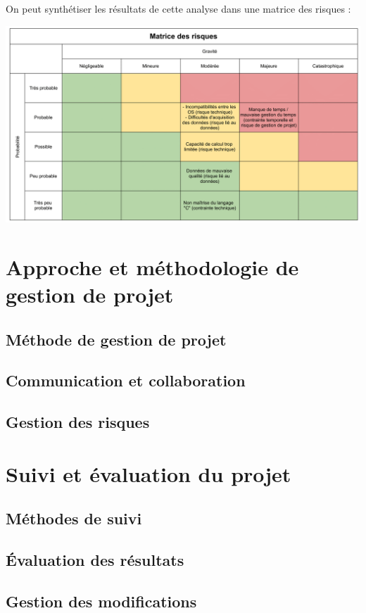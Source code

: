 \documentclass[a4paper, 12pt]{report}
\begin{document}
On peut synthétiser les résultats de cette analyse dans une matrice des risques :

\begin{center}
    \includegraphics[width = \textwidth]{IMG/mat_risques.png}
\end{center}

\clearpage
    \section{Approche et méthodologie de gestion de projet}
        \subsection{Méthode de gestion de projet}
        \subsection{Communication et collaboration}
        \subsection{Gestion des risques}

\clearpage
    \section{Suivi et évaluation du projet}
        \subsection{Méthodes de suivi}
        \subsection{Évaluation des résultats}
        \subsection{Gestion des modifications}
\end{document}
